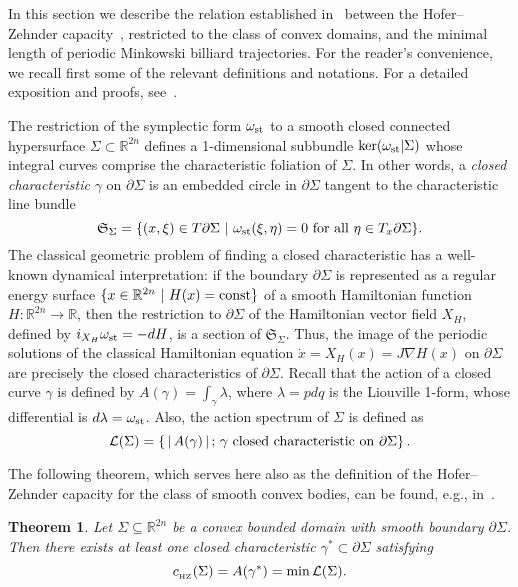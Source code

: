 \documentclass[11pt]{article}
\newtheorem{theorem}[lemma]{Theorem}
\begin{document}
{In this section we describe the relation established in~\cite{AAO1} between the Hofer--Zehnder capacity~\cite{HZ}, restricted to the class of convex domains, and the minimal length of periodic 
Minkowski billiard trajectories.  For the reader's convenience,  we recall first some of the relevant definitions and notations. For a detailed exposition and proofs, see~\cite{AAO1}.


The restriction of the symplectic form
$\omega_{\rm st}$ to a smooth closed connected hypersurface $\Sigma
\subset {\mathbb R}^{2n}$ defines a 1-dimensional subbundle
${\rm ker}(\omega_{\rm st}|\Sigma)$ whose integral curves comprise the
characteristic foliation of $\Sigma$. In other words, a {\it closed
characteristic} $\gamma$ on $\partial \Sigma$ is an embedded circle
in  $\partial \Sigma$ tangent to the characteristic line bundle
\begin{equation*} {\mathfrak S}_{\Sigma} = \{(x,\xi) \in T
\partial \Sigma \ | \ \omega_{\rm st}(\xi,\eta) = 0 \ {\rm for \ all} \ \eta \in T_x
\partial \Sigma \}. \end{equation*}
The classical geometric problem of finding a closed characteristic %
has a well-known dynamical interpretation: if  the boundary
$\partial \Sigma$ is represented as a regular energy surface $\{x
\in {\mathbb  R}^{2n} \ | \ H(x) = {\rm const} \}$ of a smooth
Hamiltonian function $H : {\mathbb  R}^{2n} \rightarrow {\mathbb
R}$, then the restriction to $\partial \Sigma$ of the Hamiltonian
vector field $X_H$, defined by $i_{X_H} \omega_{\rm st} = -dH$, is a section
of ${\mathfrak S}_{\Sigma}$. Thus, the image of the periodic
solutions of the classical Hamiltonian equation $\dot x= X_H(x) = J\nabla H(x)$ on
$\partial \Sigma$ are precisely the closed characteristics of
$\partial \Sigma$. 
Recall that the action %
of a closed curve $\gamma$ %
is defined by $A(\gamma) = \int_{\gamma} \lambda$,
where  $\lambda =pdq$ is the Liouville 1-form, whose differential is
$d \lambda = \omega_{\rm st}$. Also, the action spectrum of $\Sigma$ is defined as
\begin{equation*}  {\cal L}(\Sigma) = \left \{ \, | \, {A}({\gamma}) \,  | \, ;
\, \gamma \ {\rm closed \ characteristic \ on} \ \partial \Sigma
\right \}.\end{equation*}


The following theorem, which serves here also as the definition 
of the Hofer--Zehnder capacity for the class of smooth convex bodies, 
can be found, e.g., in~\cite{HZ}.
\begin{theorem} \label{Cap_on_covex_sets} Let $\Sigma\subseteq {\mathbb
R}^{2n}$ be a convex bounded domain with smooth boundary $\partial
\Sigma$. Then there exists at least one closed characteristic $\gamma^*
\subset \partial \Sigma$ satisfying
\begin{equation*} 
 c_{_{\rm HZ}}(\Sigma)= { A}(\gamma^*) =  \min {\cal
L}( \Sigma). \end{equation*}
\end{theorem}

}
\end{document}

